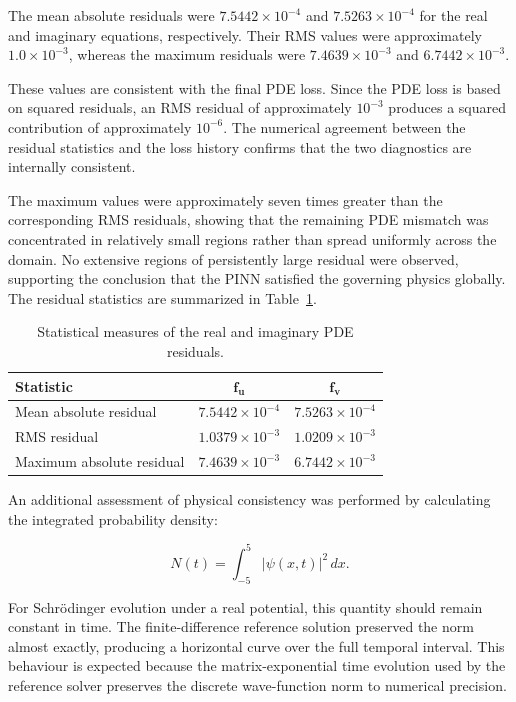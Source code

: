 \documentclass[11pt]{article}
\begin{document}
The mean absolute residuals were \(7.5442\times10^{-4}\) and \(7.5263\times10^{-4}\) for the 
real and imaginary equations, respectively. Their RMS values were approximately \(1.0\times10^{-3}\), 
whereas the maximum residuals were \(7.4639\times10^{-3}\) and \(6.7442\times10^{-3}\).

These values are consistent with the final PDE loss. Since the PDE loss is based on squared 
residuals, an RMS residual of approximately \(10^{-3}\) produces a squared contribution of 
approximately \(10^{-6}\). The numerical agreement between the residual statistics and the 
loss history confirms that the two diagnostics are internally consistent.

The maximum values were approximately seven times greater than the corresponding RMS 
residuals, showing that the remaining PDE mismatch was concentrated in relatively small 
regions rather than spread uniformly across the domain. No extensive regions of persistently 
large residual were observed, supporting the conclusion that the PINN satisfied the governing 
physics globally. The residual statistics are summarized in Table~\ref{tab:residual_statistics}.

\begin{table}[htbp]
	\centering
	\caption{Statistical measures of the real and imaginary PDE residuals.}
	\label{tab:residual_statistics}
	\begin{tabular}{lcc}
		\hline
		\textbf{Statistic} & \(\boldsymbol{f_u}\) & \(\boldsymbol{f_v}\) \\
		\hline
		Mean absolute residual
		& \(7.5442\times10^{-4}\)
		& \(7.5263\times10^{-4}\) \\
		
		RMS residual
		& \(1.0379\times10^{-3}\)
		& \(1.0209\times10^{-3}\) \\
		
		Maximum absolute residual
		& \(7.4639\times10^{-3}\)
		& \(6.7442\times10^{-3}\) \\
		\hline
	\end{tabular}
	
\end{table}


An additional assessment of physical consistency was performed 
by calculating the integrated probability density:

\begin{equation}
	N(t)
	=
	\int_{-5}^{5}
	|\psi(x,t)|^2\,dx.
\end{equation}

For Schrödinger evolution under a real potential, this quantity 
should remain constant in time. The finite-difference reference 
solution preserved the norm almost exactly, producing a horizontal 
curve over the full temporal interval. This behaviour is expected 
because the matrix-exponential time evolution used by the reference 
solver preserves the discrete wave-function norm to numerical precision.
\end{document}
